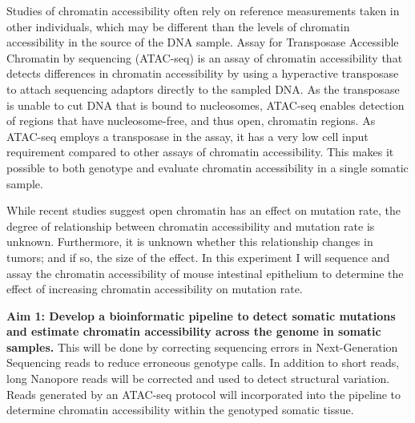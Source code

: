 Studies of chromatin accessibility often rely on reference measurements taken in other individuals, which may be different than the levels of chromatin accessibility in the source of the DNA sample. Assay for Transposase Accessible Chromatin by sequencing (ATAC-seq) is an assay of chromatin accessibility that detects differences in chromatin accessibility by using a hyperactive transposase to attach sequencing adaptors directly to the sampled DNA. As the transposase is unable to cut DNA that is bound to nucleosomes, ATAC-seq enables detection of regions that have nucleosome-free, and thus open, chromatin regions.
As ATAC-seq employs a transposase in the assay, it has a very low cell input requirement compared to other assays of chromatin accessibility. This makes it possible to both genotype and evaluate chromatin accessibility in a single somatic sample.

While recent studies suggest open chromatin has an effect on mutation rate, the degree of relationship between chromatin accessibility and mutation rate is unknown.
Furthermore, it is unknown whether this relationship changes in tumors; and if so, the size of the effect.
In this experiment I will sequence and assay the chromatin accessibility of mouse intestinal epithelium to determine the effect of increasing chromatin accessibility on mutation rate.


\textbf{Aim 1: Develop a bioinformatic pipeline to detect somatic mutations and estimate chromatin accessibility across the genome in somatic samples.}
This will be done by correcting sequencing errors in Next-Generation Sequencing reads to reduce erroneous genotype calls. In addition to short reads, long Nanopore reads will be corrected and used to detect structural variation.
Reads generated by an ATAC-seq protocol will incorporated into the pipeline to determine chromatin accessibility within the genotyped somatic tissue.


